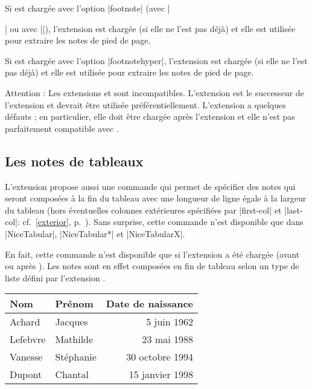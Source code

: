 \documentclass[dvipsnames]{article}%
\begin{document}
\smallskip
Si  est chargée avec l'option |footnote| (avec
|\usepackage[footnote]{nicematrix}| ou avec |\PassOptionsToPackage|),
l'extension  est chargée (si elle ne l'est pas déjà) et elle est
utilisée pour extraire les notes de pied de page.

\smallskip
Si  est chargée avec l'option |footnotehyper|, l'extension
 est chargée (si elle ne l'est pas déjà) et elle est utilisée
pour extraire les notes de pied de page.

\smallskip
Attention : Les extensions  et  sont
incompatibles. L'extension  est le successeur de l'extension
 et devrait être utilisée préférentiellement. L'extension
 a quelques défauts ; en particulier, elle doit être chargée après
l'extension  et elle n'est pas parfaitement compatible avec
.



\subsection{Les notes de tableaux}
\label{tabularnote}

L'extension  propose aussi une commande
 qui permet de spécifier des notes qui seront
composées à la fin du tableau avec une longueur de ligne égale à la largeur du
tableau (hors éventuelles colonnes extérieures spécifiées par |first-col| et
|last-col|: cf.~\ref{exterior}, p.~\pageref{exterior}). Sans surprise, cette
commande n'est disponible que dans |{NiceTabular}|, |{NiceTabular*}| et
|{NiceTabularX}|.


En fait, cette commande n'est disponible que si l'extension  a été
chargée (avant ou après ). Les notes sont en effet composées en
fin de tableau selon un type de liste défini par l'extension .

\medskip
\begin{Code}
\begin{NiceTabular}{@{}llr@{}}
\toprule \RowStyle{\bfseries}
Nom & Prénom & Date de naissance \\
\midrule
Achard\emph{}
& Jacques & 5 juin 1962 \\
Lefebvre\emph{}
& Mathilde & 23 mai 1988 \\
Vanesse & Stéphanie & 30 octobre 1994 \\
Dupont & Chantal & 15 janvier 1998 \\
\bottomrule
\end{NiceTabular}
\end{Code}
\end{document}
